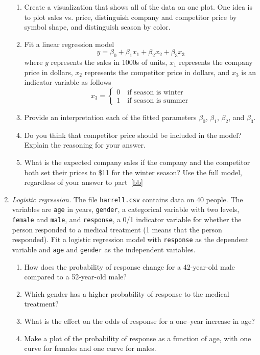 \begin{enumerate}
\begin{enumerate}
\item Create a visualization that shows all of the data on one plot.
  One idea is to plot sales vs. price, distinguish company and competitor
  price by symbol shape, and distinguish season by color.
  \item Fit a linear regression model 
\[
y = \beta_0 + \beta_1x_1 + \beta_2x_2 + \beta_3x_3
\]
where $y$ represents the sales in 1000s of units, $x_1$ represents
the company price in dollars, $x_2$ represents the competitor price in
dollars, and $x_3$ is an indicator variable as follows
\[
x_3 = \begin{cases} 0 \quad \text{if season is winter} \\
1 \quad \text{if season is summer}
\end{cases}
\]
\item Provide an interpretation each of the fitted parameters $\beta_0$, $\beta_1$,
  $\beta_2$, and $\beta_3$. \label{aa}
\item Do you think that competitor price should be included in the
  model?  Explain the reasoning for your answer. \label{bb}
\item What is the expected company sales if the company and the
  competitor both set their prices to \$11 for the winter season?  Use
  the full model, regardless of your answer to
  part~\ref{bb} \label{cc}
\end{enumerate}

\item \emph{Logistic regression.} The file \texttt{harrell.csv}
contains data on 40 people. The variables are \texttt{age} in years,
\texttt{gender}, a categorical variable with two levels, \texttt{female}
and \texttt{male}, and \texttt{response}, a 0/1 indicator variable for
whether the person responded to a medical treatment (1 means that the
person responded). Fit a logistic regression model with
\texttt{response} as the dependent variable and \texttt{age} and
\texttt{gender} as the independent variables.

\begin{enumerate}
\item How does the probability of response change for a 42-year-old male
compared to a 52-year-old male?
\item Which gender has a higher probability of response to the medical
treatment?
\item What is the effect on the odds of response for a one--year
increase in age?
\item Make a plot of the probability of response as a function
of age, with one curve for females and one curve for males.
\end{enumerate}


\end{enumerate}
